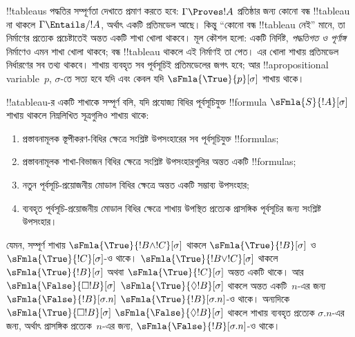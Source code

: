 \documentclass[../../../include/open-logic-section]{subfiles}
\begin{document}


\begin{explain}
  !!{tableau}s পদ্ধতির সম্পূর্ণতা দেখাতে প্রমাণ করতে হবে:
  $\Gamma \Proves !A$ প্রতিষ্ঠার জন্য কোনো বন্ধ !!{tableau} না
  থাকলে $\Gamma \Entails/ !A$, অর্থাৎ একটি প্রতিমডেল আছে।
  কিন্তু ``কোনো বন্ধ !!{tableau} নেই'' মানে, তা নির্মাণের
  প্রত্যেক প্রচেষ্টাতেই অন্তত একটি শাখা খোলা থাকবে।
  মূল কৌশল হলো: একটি নির্দিষ্ট, \emph{পদ্ধতিগত ও পূর্ণাঙ্গ}
  নির্মাণেও এমন শাখা খোলা থাকবে; বন্ধ !!{tableau} থাকলে এই
  নির্মাণই তা পেত। এর খোলা শাখায় প্রতিমডেল নির্ধারণের
  সব তথ্য থাকবে। শাখায় ব্যবহৃত সব পূর্বসূচিই প্রতিমডেলের
  জগৎ হবে; আর !!a{propositional
    variable}~$p$,
  $\sigma$-তে সত্য হবে যদি এবং কেবল যদি
  $\sFmla{\True}{p}[\sigma]$ শাখায় থাকে।
\end{explain}

\begin{defn}
  !!a{tableau}-র একটি শাখাকে সম্পূর্ণ বলি, যদি প্রযোজ্য বিধির
  পূর্বসূচিযুক্ত !!{formula} $\sFmla{S}{!A}[\sigma]$
  শাখায় থাকলে
  নিম্নলিখিত সূত্রগুলিও শাখায় থাকে:
  \begin{enumerate}
    \item প্রস্তাবনামূলক স্তূপীকরণ-বিধির ক্ষেত্রে সংশ্লিষ্ট
      উপসংহারের সব পূর্বসূচিযুক্ত !!{formula}s;
    \item প্রস্তাবনামূলক শাখা-বিভাজন বিধির ক্ষেত্রে সংশ্লিষ্ট
      উপসংহারগুলির অন্তত একটি !!{formula}s;
    \item নতুন পূর্বসূচি-প্রয়োজনীয় মোডাল বিধির ক্ষেত্রে অন্তত
      একটি সম্ভাব্য উপসংহার;
    \item ব্যবহৃত পূর্বসূচি-প্রয়োজনীয় মোডাল বিধির ক্ষেত্রে
      শাখায় উপস্থিত প্রত্যেক প্রাসঙ্গিক পূর্বসূচির জন্য
      সংশ্লিষ্ট উপসংহার।
  \end{enumerate}
\end{defn}

\begin{explain}
যেমন, সম্পূর্ণ শাখায় $\sFmla{\True}{!B \land !C}[\sigma]$
থাকলে $\sFmla{\True}{!B}[\sigma]$ ও
$\sFmla{\True}{!C}[\sigma]$-ও থাকে।
$\sFmla{\True}{!B \lor !C}[\sigma]$ থাকলে
$\sFmla{\True}{!B}[\sigma]$ অথবা
$\sFmla{\True}{!C}[\sigma]$ অন্তত একটি থাকে।
আর 
{$\sFmla{\False}{\Box !B}[\sigma]$}
{$\sFmla{\True}{\Diamond !B}[\sigma]$}
থাকলে অন্তত একটি~$n$-এর জন্য 
{$\sFmla{\False}{!B}[\sigma.n]$}
{$\sFmla{\True}{!B}[\sigma.n]$}-ও থাকে।
অন্যদিকে 
{$\sFmla{\True}{\Box !B}[\sigma]$}
{$\sFmla{\False}{\Diamond !B}[\sigma]$}
থাকলে শাখায় ব্যবহৃত প্রত্যেক $\sigma.n$-এর জন্য,
অর্থাৎ প্রাসঙ্গিক প্রত্যেক~$n$-এর জন্য,
{$\sFmla{\False}{!B}[\sigma.n]$}-ও থাকে।
\end{explain}
\end{document}
